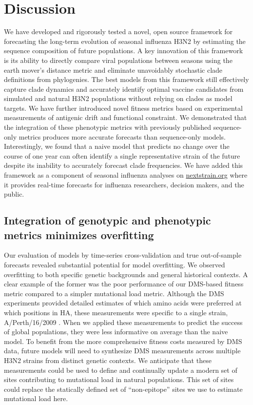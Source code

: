 \section{Discussion}

We have developed and rigorously tested a novel, open source framework for forecasting the long-term evolution of seasonal influenza H3N2 by estimating the sequence composition of future populations.
A key innovation of this framework is its ability to directly compare viral populations between seasons using the earth mover's distance metric \citep{Rubner1998} and eliminate unavoidably stochastic clade definitions from phylogenies.
The best models from this framework still effectively capture clade dynamics and accurately identify optimal vaccine candidates from simulated and natural H3N2 populations without relying on clades as model targets.
We have further introduced novel fitness metrics based on experimental measurements of antigenic drift and functional constraint.
We demonstrated that the integration of these phenotypic metrics with previously published sequence-only metrics produces more accurate forecasts than sequence-only models.
Interestingly, we found that a naive model that predicts no change over the course of one year can often identify a single representative strain of the future despite its inability to accurately forecast clade frequencies.
We have added this framework as a component of seasonal influenza analyses on \href{https://nextstrain.org/flu}{nextstrain.org} where it provides real-time forecasts for influenza researchers, decision makers, and the public.

\subsection{Integration of genotypic and phenotypic metrics minimizes overfitting}

Our evaluation of models by time-series cross-validation and true out-of-sample forecasts revealed substantial potential for model overfitting.
We observed overfitting to both specific genetic backgrounds and general historical contexts.
A clear example of the former was the poor performance of our DMS-based fitness metric compared to a simpler mutational load metric.
Although the DMS experiments provided detailed estimates of which amino acids were preferred at which positions in HA, these measurements were specific to a single strain, A/Perth/16/2009 \citep{Lee2018}.
When we applied these measurements to predict the success of global populations, they were less informative on average than the naive model.
To benefit from the more comprehensive fitness costs measured by DMS data, future models will need to synthesize DMS measurements across multiple H3N2 strains from distinct genetic contexts.
We anticipate that these measurements could be used to define and continually update a modern set of sites contributing to mutational load in natural populations.
This set of sites could replace the statically defined set of ``non-epitope'' sites we use to estimate mutational load here.

